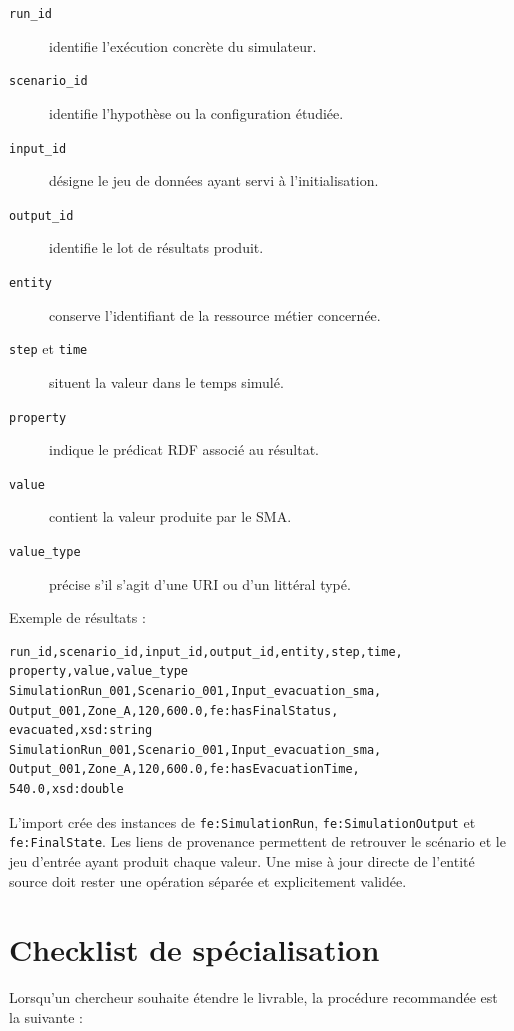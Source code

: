 \documentclass{article}
\begin{document}
\begin{description}
    \item[\texttt{run\_id}] identifie l'exécution concrète du simulateur.
    \item[\texttt{scenario\_id}] identifie l'hypothèse ou la configuration étudiée.
    \item[\texttt{input\_id}] désigne le jeu de données ayant servi à l'initialisation.
    \item[\texttt{output\_id}] identifie le lot de résultats produit.
    \item[\texttt{entity}] conserve l'identifiant de la ressource métier concernée.
    \item[\texttt{step} et \texttt{time}] situent la valeur dans le temps simulé.
    \item[\texttt{property}] indique le prédicat RDF associé au résultat.
    \item[\texttt{value}] contient la valeur produite par le SMA.
    \item[\texttt{value\_type}] précise s'il s'agit d'une URI ou d'un littéral typé.
\end{description}

Exemple de résultats :

\begin{lstlisting}
run_id,scenario_id,input_id,output_id,entity,step,time,
property,value,value_type
SimulationRun_001,Scenario_001,Input_evacuation_sma,
Output_001,Zone_A,120,600.0,fe:hasFinalStatus,
evacuated,xsd:string
SimulationRun_001,Scenario_001,Input_evacuation_sma,
Output_001,Zone_A,120,600.0,fe:hasEvacuationTime,
540.0,xsd:double
\end{lstlisting}

L'import crée des instances de \texttt{fe:SimulationRun}, \texttt{fe:SimulationOutput} et \texttt{fe:FinalState}. Les liens de provenance permettent de retrouver le scénario et le jeu d'entrée ayant produit chaque valeur. Une mise à jour directe de l'entité source doit rester une opération séparée et explicitement validée.

\clearpage
\section{Checklist de spécialisation}

Lorsqu'un chercheur souhaite étendre le livrable, la procédure recommandée est la suivante :
\end{document}

